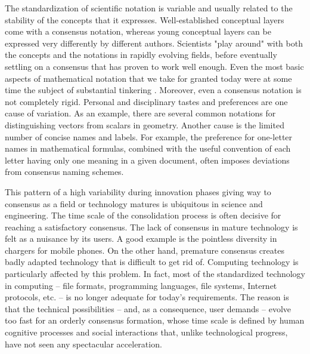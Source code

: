 The standardization of scientific notation is variable and usually related to the stability of the concepts that it expresses. Well-established conceptual layers come with a consensus notation, whereas young conceptual layers can be expressed very differently by different authors. Scientists "play around" with both the concepts and the notations in rapidly evolving fields, before eventually settling on a consensus that has proven to work well enough. Even the most basic aspects of mathematical notation that we take for granted today were at some time the subject of substantial tinkering \cite{_history_2016}. Moreover, even a consensus notation is not completely rigid. Personal and disciplinary tastes and preferences are one cause of variation. As an example, there are several common notations for distinguishing vectors from scalars in geometry. Another cause is the limited number of concise names and labels. For example, the preference for one-letter names in mathematical formulas, combined with the useful convention of each letter having only one meaning in a given document, often imposes deviations from consensus naming schemes.

This pattern of a high variability during innovation phases giving way to consensus as a field or technology matures is ubiquitous in science and engineering. The time scale of the consolidation process is often decisive for reaching a satisfactory consensus. The lack of consensus in mature technology is felt as a nuisance by its users. A good example is the pointless diversity in chargers for mobile phones. On the other hand, premature consensus creates badly adapted technology that is difficult to get rid of. Computing technology is particularly affected by this problem. In fact, most of the standardized technology in computing -- file formats, programming languages, file systems, Internet protocols, etc. -- is no longer adequate for today's requirements. The reason is that the technical possibilities -- and, as a consequence, user demands -- evolve too fast for an orderly consensus formation, whose time scale is defined by human cognitive processes and social interactions that, unlike technological progress, have not seen any spectacular acceleration.

